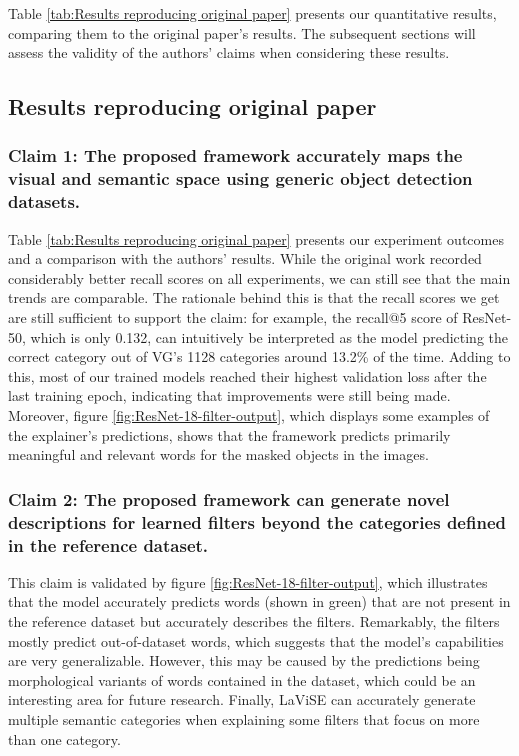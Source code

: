 Table \ref{tab:Results reproducing original paper} presents our quantitative results, comparing them to the original paper's results. The subsequent sections will assess the validity of the authors' claims when considering these results.

\subsection{Results reproducing original paper} \label{sec:Results reproducing original paper}

\subsubsection{Claim 1: The proposed framework accurately maps the visual and semantic space using generic object detection datasets.}
Table \ref{tab:Results reproducing original paper} presents our experiment outcomes and a comparison with the authors' results. While the original work recorded considerably better recall scores on all experiments, we can still see that the main trends are comparable. The rationale behind this is that the recall scores we get are still sufficient to support the claim: for example, the recall@5 score of ResNet-50, which is only 0.132, can intuitively be interpreted as the model predicting the correct category out of VG's 1128 categories around 13.2\% of the time. Adding to this, most of our trained models reached their highest validation loss after the last training epoch, indicating that improvements were still being made. Moreover, figure \ref{fig:ResNet-18-filter-output}, which displays some examples of the explainer's predictions, shows that the framework predicts primarily meaningful and relevant words for the masked objects in the images.

\subsubsection{Claim 2: The proposed framework can generate novel descriptions for learned filters beyond the categories defined in the reference dataset.}
This claim is validated by figure \ref{fig:ResNet-18-filter-output}, which illustrates that the model accurately predicts words (shown in green) that are not present in the reference dataset but accurately describes the filters. Remarkably, the filters mostly predict out-of-dataset words, which suggests that the model's capabilities are very generalizable. However, this may be caused by the predictions being morphological variants of words contained in the dataset, which could be an interesting area for future research. Finally, LaViSE can accurately generate multiple semantic categories when explaining some filters that focus on more than one category.

